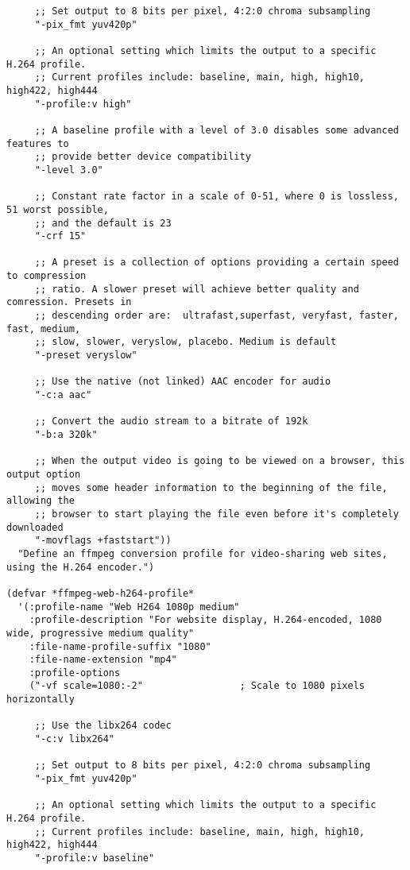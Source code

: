 \documentclass{article}
\begin{document}
\begin{verbatim}
     ;; Set output to 8 bits per pixel, 4:2:0 chroma subsampling
     "-pix_fmt yuv420p"                  

     ;; An optional setting which limits the output to a specific H.264 profile.
     ;; Current profiles include: baseline, main, high, high10, high422, high444
     "-profile:v high"

     ;; A baseline profile with a level of 3.0 disables some advanced features to
     ;; provide better device compatibility
     "-level 3.0"

     ;; Constant rate factor in a scale of 0-51, where 0 is lossless, 51 worst possible,
     ;; and the default is 23
     "-crf 15"

     ;; A preset is a collection of options providing a certain speed to compression
     ;; ratio. A slower preset will achieve better quality and comression. Presets in
     ;; descending order are:  ultrafast,superfast, veryfast, faster, fast, medium,
     ;; slow, slower, veryslow, placebo. Medium is default
     "-preset veryslow"

     ;; Use the native (not linked) AAC encoder for audio
     "-c:a aac"

     ;; Convert the audio stream to a bitrate of 192k
     "-b:a 320k"

     ;; When the output video is going to be viewed on a browser, this output option
     ;; moves some header information to the beginning of the file, allowing the
     ;; browser to start playing the file even before it's completely downloaded
     "-movflags +faststart"))
  "Define an ffmpeg conversion profile for video-sharing web sites, using the H.264 encoder.")

(defvar *ffmpeg-web-h264-profile*
  '(:profile-name "Web H264 1080p medium"
    :profile-description "For website display, H.264-encoded, 1080 wide, progressive medium quality"
    :file-name-profile-suffix "1080"
    :file-name-extension "mp4"
    :profile-options
    ("-vf scale=1080:-2"                 ; Scale to 1080 pixels horizontally

     ;; Use the libx264 codec
     "-c:v libx264"
     
     ;; Set output to 8 bits per pixel, 4:2:0 chroma subsampling
     "-pix_fmt yuv420p"                  

     ;; An optional setting which limits the output to a specific H.264 profile.
     ;; Current profiles include: baseline, main, high, high10, high422, high444
     "-profile:v baseline"


\end{verbatim}
\end{document}
